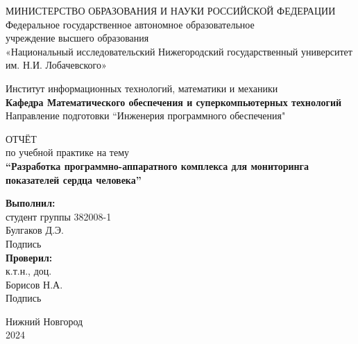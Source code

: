 \documentclass[12pt, russian]{extarticle}
\title{}
\author{}
\date{}
\begin{document}
    \begin{titlepage}

        \begin{center}
            МИНИСТЕРСТВО ОБРАЗОВАНИЯ И НАУКИ РОССИЙСКОЙ ФЕДЕРАЦИИ \\
            Федеральное государственное автономное образовательное \\
            учреждение высшего образования \\
            «Национальный исследовательский Нижегородский государственный университет им. Н.И. Лобачевского»\\
        \end{center}

        \bigbreak

        \begin{center}
            Институт информационных технологий, математики и механики \\
            {\bfseries Кафедра Математического обеспечения и суперкомпьютерных технологий} \\
            Направление подготовки ``Инженерия программного обеспечения"
        \end{center}

        \vspace{2em}

        \begin{center}
            ОТЧЁТ \\ по учебной практике на тему \\
            {\bfseries ``Разработка программно-аппаратного комплекса для мониторинга показателей сердца
            человека''}
        \end{center}

        \vspace{5em}

        \begin{flushright}
            {\bfseries Выполнил:} \\студент группы 382008-1\\Булгаков Д.Э.\\
            \hfill Подпись \hspace{5em} \newline \\
            {\bfseries Проверил:} \\к.т.н., доц.\\ Борисов Н.А. \\
            \hfill Подпись \hspace{5em} \newline \\
        \end{flushright}


        \vspace{\fill}

        \begin{center}
            Нижний Новгород\\2024
        \end{center}
    \end{titlepage}
\end{document}
